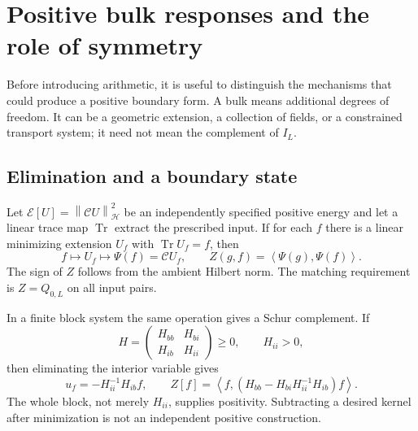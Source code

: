 \documentclass[11pt]{article}
\numberwithin{equation}{section}
\theoremstyle{definition}
\theoremstyle{remark}
\newcommand{\norm}[1]{\left\lVert#1\right\rVert}
\newcommand{\ip}[2]{\left\langle#1,#2\right\rangle}
\begin{document}
\section{Positive bulk responses and the role of symmetry}
\label{sec:principles}
Before introducing arithmetic, it is useful to distinguish the mechanisms that could produce a positive boundary form. A bulk means additional degrees of freedom. It can be a geometric extension, a collection of fields, or a constrained transport system; it need not mean the complement of $I_L$.

\subsection{Elimination and a boundary state}
Let $\mathcal E[U]=\norm{\mathcal C U}_{\mathcal H}^2$ be an independently specified positive energy and let a linear trace map $\operatorname{Tr}$ extract the prescribed input. If for each $f$ there is a linear minimizing extension $U_f$ with $\operatorname{Tr}U_f=f$, then
\begin{equation}
 f\longmapsto U_f\longmapsto\Psi(f)=\mathcal C U_f,
 \qquad Z(g,f)=\ip{\Psi(g)}{\Psi(f)}.
 \label{eq:bulkroute}
\end{equation}
The sign of $Z$ follows from the ambient Hilbert norm. The matching requirement is $Z=Q_{0,L}$ on all input pairs.

In a finite block system the same operation gives a Schur complement. If
\begin{equation}
 H=\begin{pmatrix}H_{bb}&H_{bi}\\H_{ib}&H_{ii}\end{pmatrix}\ge0,
 \qquad H_{ii}>0,
\end{equation}
then eliminating the interior variable gives
\begin{equation}
 u_f=-H_{ii}^{-1}H_{ib}f,
 \qquad Z[f]=\ip{f}{(H_{bb}-H_{bi}H_{ii}^{-1}H_{ib})f}.
\end{equation}
The whole block, not merely $H_{ii}$, supplies positivity. Subtracting a desired kernel after minimization is not an independent positive construction.
\end{document}
